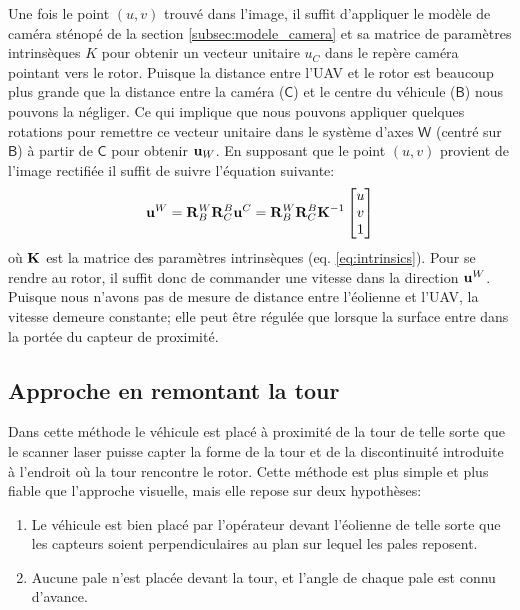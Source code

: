 Une fois le point $(u,v)$ trouvé dans l'image, il suffit d'appliquer le modèle de caméra sténopé de la section \ref{subsec:modele_camera} et sa matrice de paramètres intrinsèques $K$ pour obtenir un vecteur unitaire $u_C$ dans le repère caméra pointant vers le rotor. Puisque la distance entre l'UAV et le rotor est beaucoup plus grande que la distance entre la caméra ($\mathsf{C}$) et le centre du véhicule ($\mathsf{B}$) nous pouvons la négliger. Ce qui implique que nous pouvons appliquer quelques rotations pour remettre ce vecteur unitaire dans le système d'axes $\mathsf{W}$ (centré sur $\mathsf{B}$) à partir de $\mathsf{C}$ pour obtenir $\mathbf{u}_W$. En supposant que le point $(u,v)$ provient de l'image rectifiée il suffit de suivre l'équation suivante:
\begin{align}
  \mathbf{u}^W = \mathbf{R}^W_B \mathbf{R}^B_C \mathbf{u}^C = \mathbf{R}^W_B \mathbf{R}^B_C \mathbf{K}^{-1} \begin{bmatrix}u \\ v \\ 1\end{bmatrix}
\end{align}
où $\mathbf{K}$ est la matrice des paramètres intrinsèques (eq. \ref{eq:intrinsics}). Pour se rendre au rotor, il suffit donc de commander une vitesse dans la direction $\mathbf{u}^W$. Puisque nous n'avons pas de mesure de distance entre l'éolienne et l'UAV, la vitesse demeure constante; elle peut être régulée que lorsque la surface entre dans la portée du capteur de proximité.

\subsection{Approche en remontant la tour}
\label{subsec:laser_tower}

Dans cette méthode le véhicule est placé à proximité de la tour de telle sorte que le scanner laser puisse capter la forme de la tour et de la discontinuité introduite à l'endroit où la tour rencontre le rotor. Cette méthode est plus simple et plus fiable que l'approche visuelle, mais elle repose sur deux hypothèses:
\begin{enumerate}
  \item Le véhicule est bien placé par l'opérateur devant l'éolienne de telle sorte que les capteurs soient perpendiculaires au plan sur lequel les pales reposent.
  \item Aucune pale n'est placée devant la tour, et l'angle de chaque pale est connu d'avance.
\end{enumerate}

